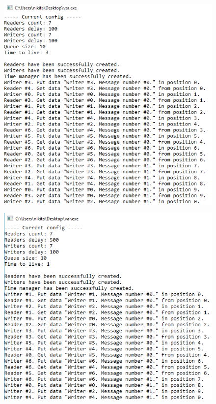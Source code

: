 \documentclass[14pt,a4paper,report]{report}
\begin{document}
\begin{figure}[h!]
	\centering
	\includegraphics[scale = 0.72]{images/p1_6_1.png}
	
	\caption{}
	\label{image:11}
\end{figure}

\begin{figure}[h!]
	\centering
	\includegraphics[scale = 0.72]{images/p1_6_2.png}
	
	\caption{}
	\label{image:12}
\end{figure}
\end{document}
